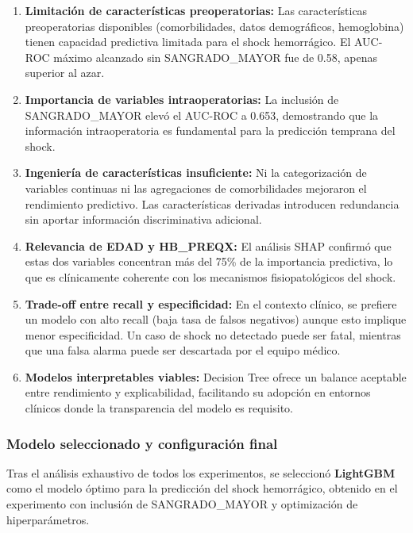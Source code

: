 \documentclass[12pt, letterpaper]{article}
\begin{document}
\begin{enumerate}
    \item \textbf{Limitación de características preoperatorias:} Las características preoperatorias disponibles (comorbilidades, datos demográficos, hemoglobina) tienen capacidad predictiva limitada para el shock hemorrágico. El AUC-ROC máximo alcanzado sin SANGRADO\_MAYOR fue de 0.58, apenas superior al azar.
    
    \item \textbf{Importancia de variables intraoperatorias:} La inclusión de SANGRADO\_MAYOR elevó el AUC-ROC a 0.653, demostrando que la información intraoperatoria es fundamental para la predicción temprana del shock.
    
    \item \textbf{Ingeniería de características insuficiente:} Ni la categorización de variables continuas ni las agregaciones de comorbilidades mejoraron el rendimiento predictivo. Las características derivadas introducen redundancia sin aportar información discriminativa adicional.
    
    \item \textbf{Relevancia de EDAD y HB\_PREQX:} El análisis SHAP confirmó que estas dos variables concentran más del 75\% de la importancia predictiva, lo que es clínicamente coherente con los mecanismos fisiopatológicos del shock.
    
    \item \textbf{Trade-off entre recall y especificidad:} En el contexto clínico, se prefiere un modelo con alto recall (baja tasa de falsos negativos) aunque esto implique menor especificidad. Un caso de shock no detectado puede ser fatal, mientras que una falsa alarma puede ser descartada por el equipo médico.
    
    \item \textbf{Modelos interpretables viables:} Decision Tree ofrece un balance aceptable entre rendimiento y explicabilidad, facilitando su adopción en entornos clínicos donde la transparencia del modelo es requisito.
\end{enumerate}

\subsubsection{Modelo seleccionado y configuración final}

Tras el análisis exhaustivo de todos los experimentos, se seleccionó \textbf{LightGBM} como el modelo óptimo para la predicción del shock hemorrágico, obtenido en el experimento con inclusión de SANGRADO\_MAYOR y optimización de hiperparámetros.
\end{document}

